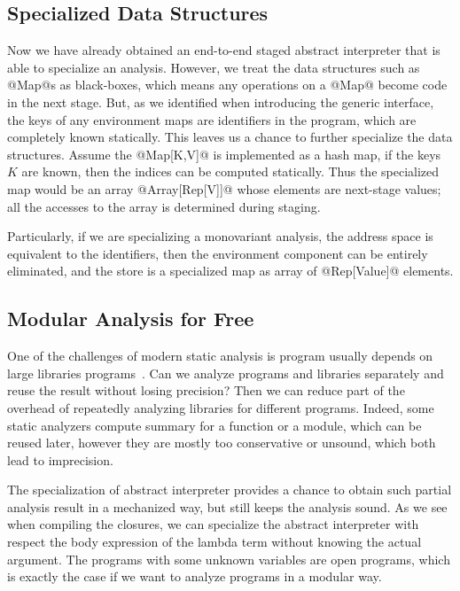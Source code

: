 \subsection{Specialized Data Structures} \label{staged_ds}

Now we have already obtained an end-to-end staged abstract interpreter that is
able to specialize an analysis. However, we treat the data structures such as
@Map@s as black-boxes, which means any operations on a @Map@ become code in the
next stage. But, as we identified when introducing the generic interface, the
keys of any environment maps are identifiers in the program, which are
completely known statically. This leaves us a chance to further specialize the
data structures. Assume the @Map[K,V]@ is implemented as a hash map, if the keys
$K$ are known, then the indices can be computed statically. Thus the specialized
map would be an array @Array[Rep[V]]@ whose elements are next-stage values; all
the accesses to the array is determined during staging.

Particularly, if we are specializing a monovariant analysis, the address space
is equivalent to the identifiers, then the environment component can be entirely
eliminated, and the store is a specialized map as array of @Rep[Value]@
elements.

\subsection{Modular Analysis for Free}

One of the challenges of modern static analysis is program usually depends on
large libraries programs~\cite{toman_et_al:LIPIcs:2017:7121}. Can we analyze
programs and libraries separately and reuse the result without losing precision?
Then we can reduce part of the overhead of repeatedly analyzing libraries for
different programs. Indeed, some static analyzers compute summary for a function
or a module, which can be reused later, however they are mostly too conservative
or unsound, which both lead to imprecision.

The specialization of abstract interpreter provides a chance to obtain such
partial analysis result in a mechanized way, but still keeps the analysis sound.
As we see when compiling the closures, we can specialize the abstract
interpreter with respect the body expression of the lambda term without knowing
the actual argument. The programs with some unknown variables are open programs,
which is exactly the case if we want to analyze programs in a modular way.

